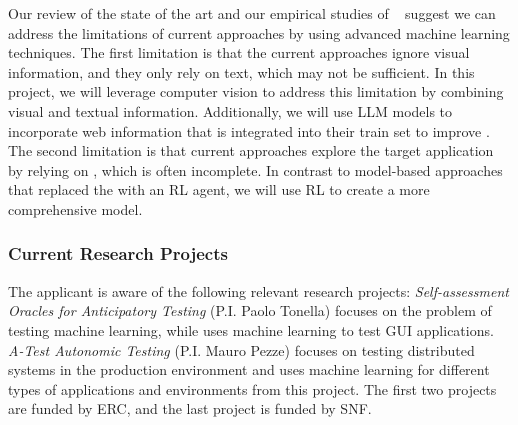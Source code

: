 
\smallskip 
Our review of the state of the art and our empirical studies of \testreuse~\cite{mariani:SemFinder:ISSTA:2021,khalili:DomainEmbedding:ICPC:2022} suggest we can address the limitations of current \testreuse approaches by using advanced machine learning techniques. 
The first limitation is that the current \testreuse approaches ignore visual information, and they only rely on text, which may not be sufficient. 
In this project, we will leverage computer vision to address this limitation by combining visual and textual information.
Additionally, we will use LLM models to incorporate web information that is integrated into their train set to improve \testreuse. 
The second limitation is that current approaches explore the target application by relying on \tam, which is often incomplete.
In contrast to model-based approaches that replaced the \tam with an RL agent, we will use RL to create a more comprehensive model.


\subsubsection{Current Research Projects}

The applicant is aware of the following relevant research projects:
 \textit{Self-assessment Oracles for Anticipatory Testing} (P.I. Paolo Tonella) focuses on the problem of testing machine learning, while \project uses machine learning to test GUI applications. \textit{A-Test Autonomic Testing} (P.I. Mauro Pezze) focuses on testing distributed systems in the production environment and uses machine learning for different types of applications and environments from this project. The first two projects are funded by ERC, and the last project is funded by SNF. 


